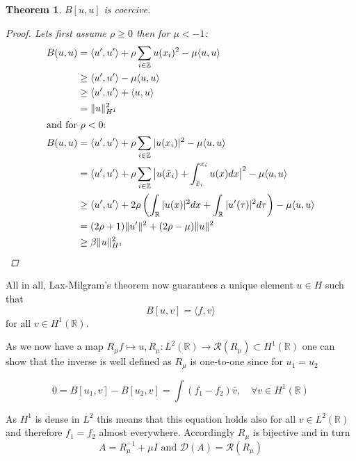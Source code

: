 \documentclass[fontsize=14pt,a4paper,DIV=1]{scrartcl}
\newtheorem{theorem}{Theorem}[section]
\numberwithin{equation}{section}
\newcommand{\R}{\mathbb{R}}
\newcommand{\Z}{\mathbb{Z}}
\begin{document}
\begin{theorem} \label{1.2}
	$B[u, u]$ is coercive.
	\begin{proof}
		Lets first assume $\rho \geq 0$ then for $\mu < -1$:
		\begin{align*}
			B(u, u) & = \langle u' , u' \rangle + \rho \sum_{i \in \Z} u(x_{i})^{2} - \mu \langle u , u \rangle \\
					& \geq \langle u' , u' \rangle - \mu \langle u , u \rangle \\
					& \geq \langle u' , u' \rangle  + \langle u , u \rangle \\
					& = \| u \|_{H^{1}}^{2} \\
			\intertext{and for $\rho < 0$:}
			B(u, u) & = \langle u' , u' \rangle + \rho \sum_{i \in \Z} |u(x_{i})|^{2} - \mu 	\langle u , u \rangle \\
					& = \langle u' , u' \rangle + \rho \sum_{i \in \Z} \big| u(\tilde{x}_{i}) + \int_{\tilde{x}_{i}}^{x_{i}} u(x) dx \big|^{2} - \mu \langle u , u \rangle \\
					& \geq \langle u' , u' \rangle + 2 \rho \left( \int_{\R} |u(x)|^{2} dx + \int_{\R} |u'(\tau)|^{2} d\tau \right) - \mu \langle u , u \rangle \\
					& = (2 \rho + 1) \| u' \|^{2} + (2\rho - \mu) \| u \|^{2}  \\
					& \geq \beta \| u \|_{H^{1}}^{2} 
		\end{align*}
	\end{proof}
\end{theorem}

All in all, Lax-Milgram's theorem now guarantees a unique element $u \in H$ such that
	\[ B[u, v] = \langle f , v \rangle \]
for all $v \in H^{1}(\R)$.	
	
As we now have a map $R_{\mu} f \mapsto u, R_{\mu} \colon L^{2}(\R) \rightarrow \mathcal{R}(R_{\mu}) \subset H^{1}(\R)$ one can show that the inverse is well defined as $R_{\mu}$ is one-to-one since for $u_{1} = u_{2}$
	
	\[ 0 = B[u_{1}, v] - B[u_{2}, v]= \int (f_{1} - f_{2}) \overline{v}, \quad \forall v \in H^{1}(\R) \]
		
As $H^{1}$ is dense in $L^{2}$ this means that this equation holds also for all $v \in L^{2}(\R)$ and therefore $f_{1} = f_{2}$ almost everywhere. Accordingly $R_{\mu}$ is bijective and in turn 
		\[ A= R_{\mu}^{-1} + \mu I \text{ and } \mathcal{D}(A) = \mathcal{R}(R_{\mu}) \]
\end{document}
